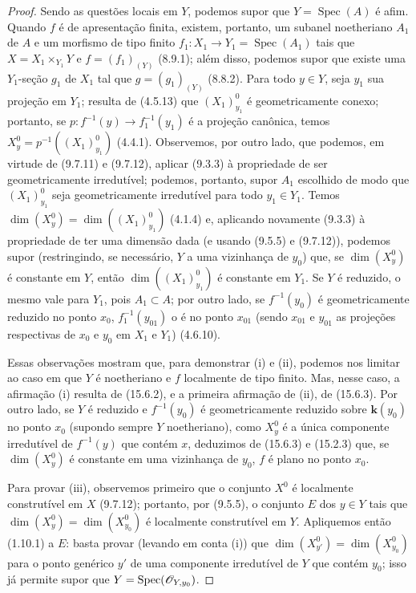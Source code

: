 \begin{proof}
Sendo as questões locais em $Y$, podemos supor que $Y=\operatorname{Spec}(A)$ é afim. Quando $f$ é de apresentação finita, existem, portanto, um subanel noetheriano $A_1$ de $A$ e um morfismo de tipo finito $f_1:X_1\to Y_1=\operatorname{Spec}(A_1)$ tais que $X=X_1\times_{Y_1}Y$ e $f=(f_1)_{(Y)}$ (8.9.1); além disso, podemos supor que existe uma $Y_1$-seção $g_1$ de $X_1$ tal que $g=(g_1)_{(Y)}$ (8.8.2). Para todo $y\in Y$, seja $y_1$ sua projeção em $Y_1$; resulta de (4.5.13) que $(X_1)_{y_1}^0$ é geometricamente conexo; portanto, se $p:f^{-1}(y)\to f_1^{-1}(y_1)$ é a projeção canônica, temos $X_y^0=p^{-1}((X_1)_{y_1}^0)$ (4.4.1). Observemos, por outro lado, que podemos, em virtude de (9.7.11) e (9.7.12), aplicar (9.3.3) à propriedade de ser geometricamente irredutível; podemos, portanto, supor $A_1$ escolhido de modo que $(X_1)_{y_1}^0$ seja geometricamente irredutível para todo $y_1\in Y_1$. Temos $\dim(X_y^0)=\dim((X_1)_{y_1}^0)$ (4.1.4) e, aplicando novamente (9.3.3) à propriedade de ter uma dimensão dada (e usando (9.5.5) e (9.7.12)), podemos supor (restringindo, se necessário, $Y$ a uma vizinhança de $y_0$) que, se $\dim(X_y^0)$ é constante em $Y$, então $\dim((X_1)_{y_1}^0)$ é constante em $Y_1$. Se $Y$ é reduzido, o mesmo vale para $Y_1$, pois $A_1\subset A$; por outro lado, se $f^{-1}(y_0)$ é geometricamente reduzido no ponto $x_0$, $f_1^{-1}(y_{01})$ o é no ponto $x_{01}$ (sendo $x_{01}$ e $y_{01}$ as projeções respectivas de $x_0$ e $y_0$ em $X_1$ e $Y_1$) (4.6.10).

Essas observações mostram que, para demonstrar (i) e (ii), podemos nos limitar ao caso em que $Y$ é noetheriano e $f$ localmente de tipo finito. Mas, nesse caso, a afirmação (i) resulta de (15.6.2), e a primeira afirmação de (ii), de (15.6.3). Por outro lado, se $Y$ é reduzido e $f^{-1}(y_0)$ é geometricamente reduzido sobre $\mathbf{k}(y_0)$ no ponto $x_0$ (supondo sempre $Y$
noetheriano), como $X_y^0$ é a única componente irredutível de $f^{-1}(y)$ que contém $x$, deduzimos de (15.6.3) e (15.2.3) que, se $\dim(X_y^0)$ é constante em uma vizinhança de $y_0$, $f$ é plano no ponto $x_0$.

Para provar (iii), observemos primeiro que o conjunto $X^0$ é localmente construtível em $X$ (9.7.12); portanto, por (9.5.5), o conjunto $E$ dos $y\in Y$ tais que $\dim(X_y^0)=\dim(X_{y_0}^0)$ é localmente construtível em $Y$. Apliquemos então (1.10.1) a $E$: basta provar (levando em conta (i)) que $\dim(X_{y'}^0)=\dim(X_{y_0}^0)$ para o ponto genérico $y'$ de uma componente irredutível de $Y$ que contém $y_0$; isso já permite supor que $Y=\operatorname{Spec}(\mathscr{O}_{Y,y_0})$.


\end{proof}
